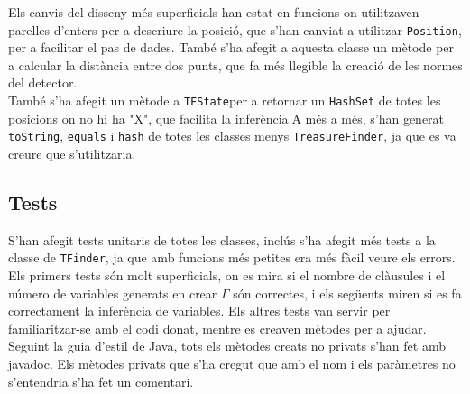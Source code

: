 
	Els canvis del disseny més superficials han estat en funcions on utilitzaven parelles d'enters per a descriure
	la posició, que s'han canviat a utilitzar \texttt{Position}, per a facilitar el pas de dades. També s'ha afegit 
	a aquesta classe un mètode per a calcular la distància entre dos punts, que fa més llegible la creació de les
	normes del detector.\\
	
	També s'ha afegit un mètode a \texttt{TFState}per a retornar un \texttt{HashSet} de totes les posicions on no
	hi ha "X", que facilita la inferència.A més a més, s'han generat \texttt{toString}, \texttt{equals} 
	i \texttt{hash} de totes les classes 	menys \texttt{TreasureFinder}, ja que es va creure que s'utilitzaria.
	\subsection{Tests}
	S'han afegit tests unitaris de totes les classes, inclús s'ha afegit més tests a la classe de \texttt{TFinder},
	ja que amb funcions més petites era més fàcil veure els errors. Els primers tests són molt superficials, on
	es mira si el nombre de clàusules i el número de variables generats en crear $\Gamma$ són correctes, i 
	els següents miren si es fa correctament la inferència de variables. Els altres tests van servir per familiaritzar-se
	amb el codi donat, mentre es creaven mètodes per a ajudar. Seguint la guia d'estil de Java, tots els mètodes
	creats no privats s'han fet amb javadoc. Els mètodes privats que s'ha cregut que amb el nom i els paràmetres
	no s'entendria s'ha fet un comentari.
